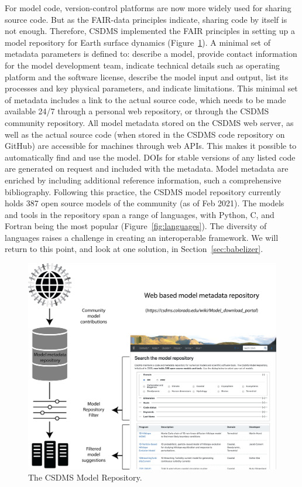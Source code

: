 \documentclass{article} %
\begin{document}
For model code, version-control platforms are now more widely used for sharing source code. But as the FAIR-data principles indicate, sharing code by itself is not enough. Therefore, CSDMS implemented the FAIR principles in setting up a model repository for Earth surface dynamics (Figure~\ref{fig:repo}). A minimal set of metadata parameters is defined to: describe a model, provide contact information for the model development team, indicate technical details such as operating platform and the software license, describe the model input and output, list its processes and key physical parameters, and indicate limitations. This minimal set of metadata includes a link to the actual source code, which needs to be made available 24/7 through a personal web repository, or through the CSDMS community repository. All model metadata stored on the CSDMS web server, as well as the actual source code (when stored in the CSDMS code repository on GitHub) are accessible for machines through web APIs. This makes it possible to automatically find and use the model. DOIs for stable versions of any listed code are generated on request and included with the metadata. Model metadata are enriched by including additional reference information, such a comprehensive bibliography. Following this practice, the CSDMS model repository currently holds 387 open source models of the community (as of Feb 2021). The models and tools in the repository span a range of languages, with Python, C, and Fortran being the most popular (Figure~\ref{fig:languages}). The diversity of languages raises a challenge in creating an interoperable framework. We will return to this point, and look at one solution, in Section~\ref{sec:babelizer}.

\begin{figure}[h!]
\centering
\includegraphics[width=5    in]{Figures/model_repository2.png}
\caption{The CSDMS Model Repository.}
\label{fig:repo}
\end{figure}
\end{document}
